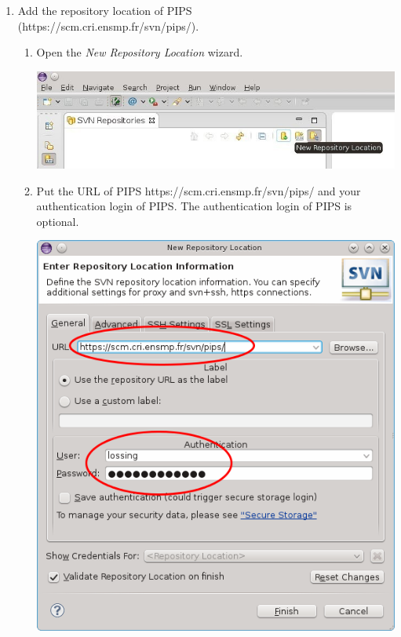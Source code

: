 \documentclass[a4paper]{article}
\begin{document}
\begin{enumerate}
\item Add the repository location of PIPS \\(https://scm.cri.ensmp.fr/svn/pips/).
\begin{enumerate}
\item Open the \emph{New Repository Location} wizard.
\begin{center}
\noindent
\includegraphics[scale=0.4]{eclipse/02-eclipseJUNO-newRepositories2.jpg}
\end{center}

\item Put the URL of PIPS https://scm.cri.ensmp.fr/svn/pips/ and your authentication login of PIPS. 
The authentication login of PIPS is optional. 
\begin{center}
\noindent
\includegraphics[scale=0.4]{eclipse/02-eclipseJUNO-newRepositories3.png}
\end{center}


\end{enumerate}
\end{enumerate}
\end{document}
